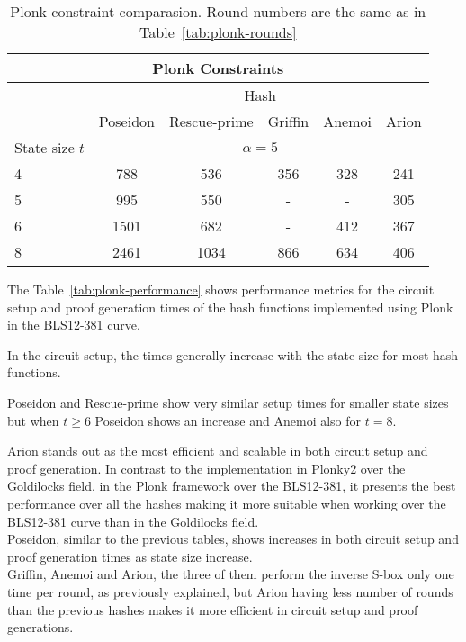 \begin{table}[htbp]
  \centering
  \begin{tabular}{@{}lccccclll@{}}
  \toprule
  \multicolumn{9}{c}{Plonk Constraints} \\ \midrule
  \multicolumn{1}{c|}{} &
    \multicolumn{8}{c}{Hash} \\ \cmidrule(l){2-9} 
  \multicolumn{1}{l|}{} &
    \multicolumn{1}{l}{Poseidon} &
    \multicolumn{1}{l}{Rescue-prime} &
    \multicolumn{1}{l}{Griffin} &
    \multicolumn{1}{l}{Anemoi} &
    \multicolumn{4}{l}{Arion} \\ \midrule
  \multicolumn{1}{l|}{State size $t$} &
    \multicolumn{8}{c}{$\alpha=5$} \\ \midrule
  \multicolumn{1}{l|}{4} &
    \multicolumn{1}{c|}{788} &
    \multicolumn{1}{c|}{536} &
    \multicolumn{1}{c|}{356} &
    \multicolumn{1}{c|}{328} &
    \multicolumn{4}{c}{241} \\
  \multicolumn{1}{l|}{5} &
    \multicolumn{1}{c|}{995} &
    \multicolumn{1}{c|}{550} &
    \multicolumn{1}{c|}{-} &
    \multicolumn{1}{c|}{-} &
    \multicolumn{4}{c}{305} \\
  \multicolumn{1}{l|}{6} &
    \multicolumn{1}{c|}{1501} &
    \multicolumn{1}{c|}{682} &
    \multicolumn{1}{c|}{-} &
    \multicolumn{1}{c|}{412} &
    \multicolumn{4}{c}{367} \\
  \multicolumn{1}{l|}{8} &
    \multicolumn{1}{c|}{2461} &
    \multicolumn{1}{c|}{1034} &
    \multicolumn{1}{c|}{866} &
    \multicolumn{1}{c|}{634} &
    \multicolumn{4}{c}{406} \\ \bottomrule
  \end{tabular}
  \caption{Plonk constraint comparasion. Round numbers are the same as in Table~\ref{tab:plonk-rounds}}
  \label{tab:plonk-constraints}
  \end{table}


The Table~\ref{tab:plonk-performance} shows performance metrics for the circuit setup and proof generation times of the hash functions implemented using Plonk in the BLS12-381 curve.

In the circuit setup, the times generally increase with the state size for most hash functions.

Poseidon and Rescue-prime show very similar setup times for smaller state sizes but when $t\geq6$ Poseidon shows an increase and Anemoi also for $t=8$.

Arion stands out as the most efficient and scalable in both circuit setup and proof generation. In contrast to the implementation in Plonky2 over the Goldilocks field, in the Plonk framework over the BLS12-381, it presents the best performance over all the hashes making it more suitable when working over the BLS12-381 curve than in the Goldilocks field.\\
Poseidon, similar to the previous tables, shows increases in both circuit setup and proof generation times as state size increase.\\
Griffin, Anemoi and Arion, the three of them perform the inverse S-box only one time per round, as previously explained, but Arion having less number of rounds than the previous hashes makes it more efficient in circuit setup and proof generations.

